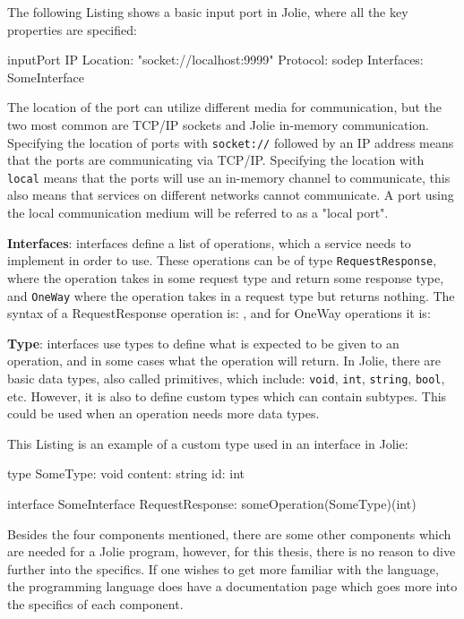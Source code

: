 The following Listing shows a basic input port in Jolie, where all the key properties are specified:

\begin{jolisting}[][caption={
    },label=lst:simple-inputport]
inputPort IP {
    Location: "socket://localhost:9999"
    Protocol: sodep
    Interfaces: SomeInterface
}
\end{jolisting}

The location of the port can utilize different media for communication, but the two most common are TCP/IP sockets and Jolie in-memory communication.
Specifying the location of ports with \texttt{socket://} followed by an IP address means that the ports are communicating via TCP/IP.
Specifying the location with \texttt{local} means that the ports will use an in-memory channel to communicate, this also means that services on different networks cannot communicate.
A port using the local communication medium will be referred to as a "local port".

\textbf{Interfaces}: interfaces define a list of operations, which a service needs to implement in order to use. These operations can be of type \texttt{RequestResponse}, where the operation takes in some request type and return some response type, 
and \texttt{OneWay} where the operation takes in a request type but returns nothing. The syntax of a RequestResponse operation is: , and for OneWay operations it is: 

\textbf{Type}: interfaces use types to define what is expected to be given to an operation, and in some cases what the operation will return. In Jolie, there are basic
data types, also called primitives, which include: \texttt{void}, \texttt{int}, \texttt{string}, \texttt{bool}, etc. However, it is also to define custom types which can contain subtypes.
This could be used when an operation needs more data types.

This Listing is an example of a custom type used in an interface in Jolie:
\begin{jolisting}[][caption={
    },label=lst:type-with-interf]
type SomeType: void {
    content: string
    id: int
}

interface SomeInterface {
    RequestResponse:
        someOperation(SomeType)(int)
}
\end{jolisting}

Besides the four components mentioned, there are some other components which are needed for a Jolie program, however, for this thesis, there is no reason to dive further into the specifics.
If one wishes to get more familiar with the language, the programming language does have a documentation page which goes more into the specifics of each component.

